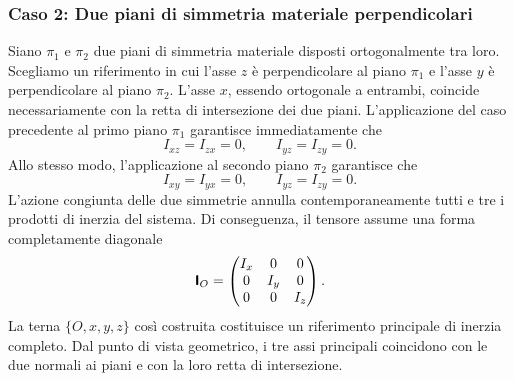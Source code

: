 \subsubsection*{Caso 2: Due piani di simmetria materiale perpendicolari}
Siano $\pi_1$ e $\pi_2$ due piani di simmetria materiale disposti ortogonalmente tra loro. Scegliamo un riferimento in cui l'asse $z$ è perpendicolare al piano $\pi_1$ e l'asse $y$ è perpendicolare al piano $\pi_2$. L'asse $x$, essendo ortogonale a entrambi, coincide necessariamente con la retta di intersezione dei due piani. L'applicazione del caso precedente al primo piano $\pi_1$ garantisce immediatamente che
\begin{equation*}
    I_{xz} = I_{zx} = 0, \qquad I_{yz} = I_{zy} = 0.
\end{equation*}
Allo stesso modo, l'applicazione al secondo piano $\pi_2$ garantisce che
\begin{equation*}
    I_{xy} = I_{yx} = 0, \qquad I_{yz} = I_{zy} = 0.
\end{equation*}
L'azione congiunta delle due simmetrie annulla contemporaneamente tutti e tre i prodotti di inerzia del sistema. Di conseguenza, il tensore assume una forma completamente diagonale
\begin{equation*}
    \boldsymbol{\mathsf{I}}_O = \begin{pmatrix}
        I_x & 0 & 0 \\
        0 & I_y & 0 \\
        0 & 0 & I_z
    \end{pmatrix}.
\end{equation*}
La terna $\{O, x, y, z\}$ così costruita costituisce un riferimento principale di inerzia completo. Dal punto di vista geometrico, i tre assi principali coincidono con le due normali ai piani e con la loro retta di intersezione.

